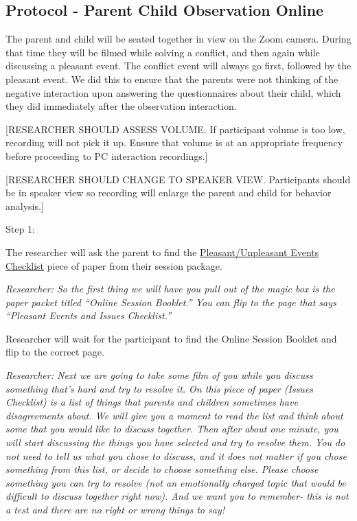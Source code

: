 \documentclass[]{book}
\begin{document}
\hypertarget{protocol---parent-child-observation-online-1}{%
\subsection{Protocol - Parent Child Observation Online}\label{protocol---parent-child-observation-online-1}}

The parent and child will be seated together in view on the Zoom camera. During that time they will be filmed while solving a conflict, and then again while discussing a pleasant event. The conflict event will always go first, followed by the pleasant event. We did this to ensure that the parents were not thinking of the negative interaction upon answering the questionnaires about their child, which they did immediately after the observation interaction.

{[}RESEARCHER SHOULD ASSESS VOLUME. If participant volume is too low, recording will not pick it up. Ensure that volume is at an appropriate frequency before proceeding to PC interaction recordings.{]}

{[}RESEARCHER SHOULD CHANGE TO SPEAKER VIEW. Participants should be in speaker view so recording will enlarge the parent and child for behavior analysis.{]}

Step 1:

The researcher will ask the parent to find the \href{https://ucla.app.box.com/file/630327764749}{Pleasant/Unpleasant Events Checklist} piece of paper from their session package.

\emph{Researcher: So the first thing we will have you pull out of the magic box is the paper packet titled ``Online Session Booklet.'' You can flip to the page that says ``Pleasant Events and Issues Checklist.''}

Researcher will wait for the participant to find the Online Session Booklet and flip to the correct page.

\emph{Researcher: Next we are going to take some film of you while you discuss something that's hard and try to resolve it. On this piece of paper (Issues Checklist) is a list of things that parents and children sometimes have disagreements about. We will give you a moment to read the list and think about some that you would like to discuss together. Then after about one minute, you will start discussing the things you have selected and try to resolve them. You do not need to tell us what you chose to discuss, and it does not matter if you chose something from this list, or decide to choose something else. Please choose something you can try to resolve (not an emotionally charged topic that would be difficult to discuss together right now). And we want you to remember- this is not a test and there are no right or wrong things to say!}
\end{document}
